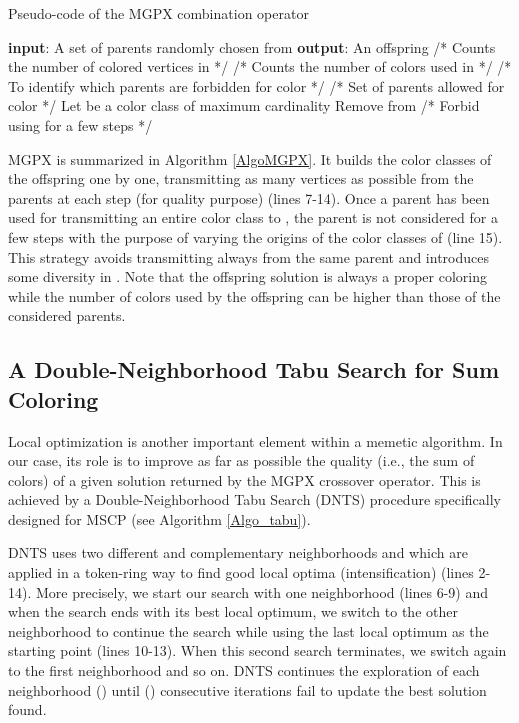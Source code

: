 \documentclass{elsart}
\begin{document}
\begin{algorithm}[h]
\footnotesize
\caption{Pseudo-code of the MGPX combination operator}
\label{AlgoMGPX}
\begin{algorithmic}[1]
\STATE \textbf{input}: A set  of  parents randomly chosen from 
\STATE \textbf{output}: An offspring 
\STATE  /* Counts the number of colored vertices in  */
\STATE  /* Counts the number of colors used in  */
\STATE  /* To identify which parents are forbidden for color  */
\WHILE{}
	\STATE 
	\STATE  /* Set of parents allowed for color  */
	\STATE Let  be a color class of maximum cardinality 
	\STATE 
	\FORALL{}
		\STATE 
		\STATE Remove  from 
	\ENDFOR
	\STATE  /* Forbid using  for a few steps */
\ENDWHILE
\RETURN 
\end{algorithmic}
\end{algorithm}


MGPX is summarized in Algorithm \ref{AlgoMGPX}. It builds the color classes of the  offspring one by one, transmitting as many vertices as possible from the parents at each step (for quality purpose) (lines 7-14). Once a parent has been used for transmitting an entire color class to , the parent is not considered for a few steps with the purpose of varying the origins of the color classes of  (line 15). This strategy avoids transmitting always from the same parent and introduces some diversity in  \cite{Lu&Hao2010}. Note that the offspring solution is always a proper  coloring while the number of colors used by the offspring can be higher than those of the considered parents.







\subsection{A Double-Neighborhood Tabu Search for Sum Coloring}
\label{subsec_sol_TS}


Local optimization is another important element within a memetic algorithm. In our case, its role is to improve as far as possible the quality (i.e., the sum of colors) of a given solution returned by the MGPX crossover operator. This is achieved by a Double-Neighborhood Tabu Search (DNTS) procedure specifically designed for MSCP (see Algorithm \ref{Algo_tabu}). 

DNTS uses two different and complementary neighborhoods  and  which are applied in a token-ring way \cite{GasperoSchaerf2006,Luetal2011} to find good local optima (intensification) (lines 2-14). More precisely, we start our search with one neighborhood (lines 6-9) and when the search ends with its best local optimum, we switch to the other neighborhood to continue the search while using the last local optimum as the starting point (lines 10-13). When this second search terminates, we switch again to the first neighborhood and so on. DNTS continues the exploration of each neighborhood  () until  () consecutive iterations fail to update the best solution found. 
\end{document}
